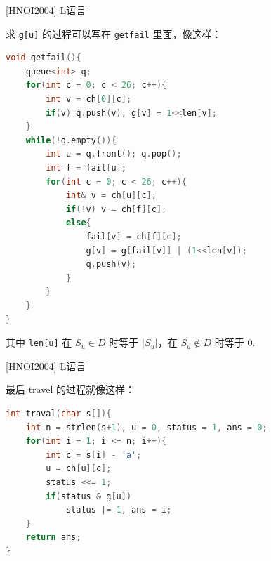 \documentclass{beamer}
\begin{document}
\begin{frame}[fragile]{[HNOI2004] L语言}
    \footnotesize

    求 \verb|g[u]| 的过程可以写在 \verb|getfail| 里面，像这样：

    \begin{lstlisting}[language=c++]
void getfail(){
    queue<int> q;
    for(int c = 0; c < 26; c++){
        int v = ch[0][c];
        if(v) q.push(v), g[v] = 1<<len[v];
    }
    while(!q.empty()){
        int u = q.front(); q.pop();
        int f = fail[u];
        for(int c = 0; c < 26; c++){
            int& v = ch[u][c];
            if(!v) v = ch[f][c];
            else{
                fail[v] = ch[f][c];
                g[v] = g[fail[v]] | (1<<len[v]);
                q.push(v);
            }
        }
    }
}
    \end{lstlisting}

    其中 \verb|len[u]| 在 $S_u\in D$ 时等于 $|S_u|$，在 $S_u\notin D$ 时等于 $0$.
\end{frame}

\begin{frame}[fragile]{[HNOI2004] L语言}
    \footnotesize

    最后 travel 的过程就像这样：

    \begin{lstlisting}[language=c++]
int traval(char s[]){
    int n = strlen(s+1), u = 0, status = 1, ans = 0;
    for(int i = 1; i <= n; i++){
        int c = s[i] - 'a';
        u = ch[u][c];
        status <<= 1;
        if(status & g[u])
            status |= 1, ans = i;
    }
    return ans;
}
    \end{lstlisting}
\end{frame}
\end{document}
